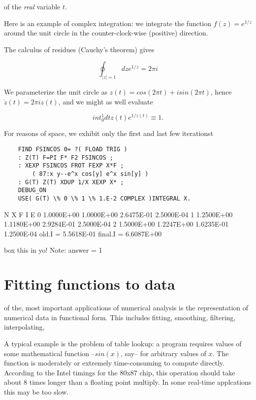 of the \textit{real} variable $t$.

Here is an example of complex integration: we integrate the function $f(z) = e^{1/z}$ around the unit circle in the counter-clock-wise (positive) direction.

The calculus of residues (Cauchy's theorem) gives

\begin{equation}
\oint_{ \vert z \vert =1} dz e^{1/z} = 2\pi i
\end{equation}

We parameterize the unit circle as $z(t) = cos(2\pi t) + i sin(2\pi t)$, hence $\dot{z}(t) = 2\pi iz(t)$, and we might as well evaluate

\begin{equation}
int_{0}^{1} dt z(t) e^{1/z(t)} \equiv 1.
\end{equation}

For reasons of space, we exhibit only the first and last few iterationst

\begin{lstlisting}
    FIND FSINCOS 0= ?( FLOAD TRIG )
    : Z(T) F=PI F* F2 FSINCOS ;
    : XEXP FSINCOS FROT FEXP X*F ;
        ( 87:x y--e^x cos[y] e^x sin[y] )
    : G(T) Z(T) XDUP 1/X XEXP X* ;
    DEBUG_ON
    USE( G(T) \% 0 \% 1 \% 1.E-2 COMPLEX )INTEGRAL X.
\end{lstlisting}

N      X            F          I             E
0 1.0000E+00  1.0000E+00 2.6475E-01 2.5000E-04
1 1.2500E+00  1.1180E+00 2.9284E-01 2.5000E-04
2 1.5000E+00  1.2247E+00 1.6235E-01 1.2500E-04
old.I = 5.5618E-01    final.I = 6.6087E+00

box this in yo!
Note:
    answer = 1

\section{Fitting functions to data}
 of the, most important applications of numerical analysis is the representation of numerical data in functional form. This includes fitting, smoothing, filtering, interpolating, \etc

A typical example is the problem of table lookup: a program requires values of some mathematical function --$sin(x)$, say-- for arbitrary values of $x$. The function is moderately or extremely time-consuming to compute directly. According to the Intel timings for the 80x87 chip, this operation should take about 8 times longer than a floating point multiply. In some real-time applcations this may be too slow.

